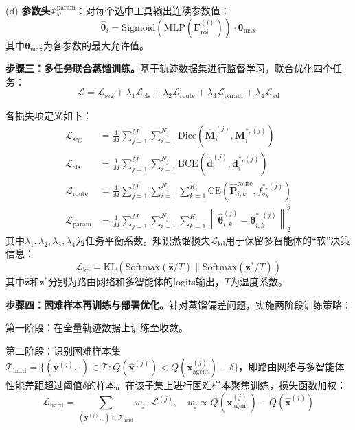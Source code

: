 (d) \textbf{参数头}$\Phi_{\omega}^{\text{param}}$：对每个选中工具输出连续参数值：
\begin{equation}
\hat{\boldsymbol{\theta}}_i = \text{Sigmoid}\left(\text{MLP}\left(\mathbf{F}_{\text{roi}}^{(i)}\right)\right) \cdot \boldsymbol{\theta}_{\max}
\end{equation}
其中$\boldsymbol{\theta}_{\max}$为各参数的最大允许值。

\textbf{步骤三：多任务联合蒸馏训练。}基于轨迹数据集进行监督学习，联合优化四个任务：
\begin{equation}
\mathcal{L} = \mathcal{L}_{\text{seg}} + \lambda_1 \mathcal{L}_{\text{cls}} + \lambda_2 \mathcal{L}_{\text{route}} + \lambda_3 \mathcal{L}_{\text{param}} + \lambda_4 \mathcal{L}_{\text{kd}}
\end{equation}

各损失项定义如下：
\begin{align}
\mathcal{L}_{\text{seg}} &= \frac{1}{M} \sum_{j=1}^{M} \sum_{i=1}^{N_j} \text{Dice}\left(\hat{\mathbf{M}}_i^{(j)}, \mathbf{M}_i^{*,(j)}\right) \\
\mathcal{L}_{\text{cls}} &= \frac{1}{M} \sum_{j=1}^{M} \sum_{i=1}^{N_j} \text{BCE}\left(\hat{\mathbf{d}}_i^{(j)}, \mathbf{d}_i^{*,(j)}\right) \\
\mathcal{L}_{\text{route}} &= \frac{1}{M} \sum_{j=1}^{M} \sum_{i=1}^{N_j} \sum_{k=1}^{K_i} \text{CE}\left(\hat{\mathbf{P}}^{\text{route}}_{i,k}, f_{\sigma_k}^{*,(j)}\right) \\
\mathcal{L}_{\text{param}} &= \frac{1}{M} \sum_{j=1}^{M} \sum_{i=1}^{N_j} \sum_{k=1}^{K_i} \left\|\hat{\boldsymbol{\theta}}_{i,k}^{(j)} - \boldsymbol{\theta}_{i,k}^{*,(j)}\right\|_2^2
\end{align}
其中$\lambda_1, \lambda_2, \lambda_3, \lambda_4$为任务平衡系数。知识蒸馏损失$\mathcal{L}_{\text{kd}}$用于保留多智能体的“软”决策信息：
\begin{equation}
\mathcal{L}_{\text{kd}} = \text{KL}\left(\text{Softmax}(\hat{\mathbf{z}} / T) \| \text{Softmax}(\mathbf{z}^{*} / T)\right)
\end{equation}
其中$\hat{\mathbf{z}}$和$\mathbf{z}^{*}$分别为路由网络和多智能体的logits输出，$T$为温度系数。

\textbf{步骤四：困难样本再训练与部署优化。}针对蒸馏偏差问题，实施两阶段训练策略：

第一阶段：在全量轨迹数据上训练至收敛。

第二阶段：识别困难样本集$\mathcal{T}_{\text{hard}} = \{(\mathbf{y}^{(j)}, \cdot) \in \mathcal{T} : Q(\hat{\mathbf{x}}^{(j)}) < Q(\mathbf{x}_{\text{agent}}^{(j)}) - \delta\}$，即路由网络与多智能体性能差距超过阈值$\delta$的样本。在该子集上进行困难样本聚焦训练，损失函数加权：
\begin{equation}
\mathcal{L}_{\text{hard}} = \sum_{(\mathbf{y}^{(j)}, \cdot) \in \mathcal{T}_{\text{hard}}} w_j \cdot \mathcal{L}^{(j)}, \quad w_j \propto Q(\mathbf{x}_{\text{agent}}^{(j)}) - Q(\hat{\mathbf{x}}^{(j)})
\end{equation}

